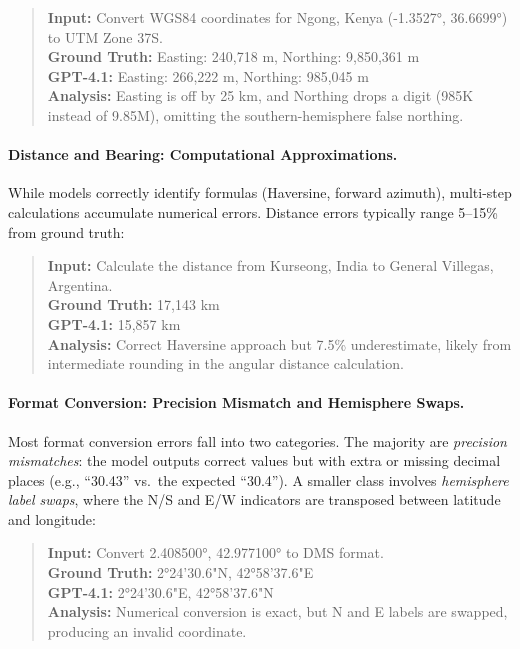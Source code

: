 \begin{quote}
\small
\textbf{Input:} Convert WGS84 coordinates for Ngong, Kenya (-1.3527°, 36.6699°) to UTM Zone 37S.\\
\textbf{Ground Truth:} Easting: 240,718 m, Northing: 9,850,361 m\\
\textbf{GPT-4.1:} Easting: 266,222 m, Northing: 985,045 m\\
\textbf{Analysis:} Easting is off by 25 km, and Northing drops a digit (985K instead of 9.85M), omitting the southern-hemisphere false northing.
\end{quote}

\paragraph{Distance and Bearing: Computational Approximations.}
While models correctly identify formulas (Haversine, forward azimuth), multi-step calculations accumulate numerical errors. Distance errors typically range 5--15\% from ground truth:

\begin{quote}
\small
\textbf{Input:} Calculate the distance from Kurseong, India to General Villegas, Argentina.\\
\textbf{Ground Truth:} 17,143 km\\
\textbf{GPT-4.1:} 15,857 km\\
\textbf{Analysis:} Correct Haversine approach but 7.5\% underestimate, likely from intermediate rounding in the angular distance calculation.
\end{quote}

\paragraph{Format Conversion: Precision Mismatch and Hemisphere Swaps.}
Most format conversion errors fall into two categories. The majority are \textit{precision mismatches}: the model outputs correct values but with extra or missing decimal places (e.g., ``30.43\arcsec'' vs.\ the expected ``30.4\arcsec''). A smaller class involves \textit{hemisphere label swaps}, where the N/S and E/W indicators are transposed between latitude and longitude:

\begin{quote}
\small
\textbf{Input:} Convert 2.408500°, 42.977100° to DMS format.\\
\textbf{Ground Truth:} 2°24'30.6"N, 42°58'37.6"E\\
\textbf{GPT-4.1:} 2°24'30.6"E, 42°58'37.6"N\\
\textbf{Analysis:} Numerical conversion is exact, but N and E labels are swapped, producing an invalid coordinate.
\end{quote}

